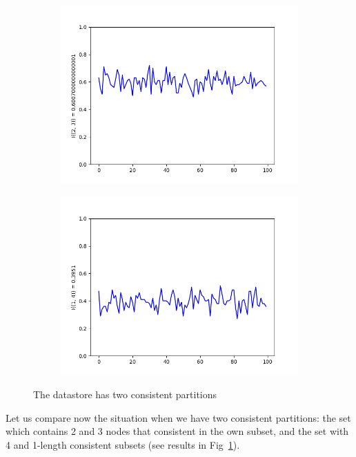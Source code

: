 \documentclass{llncs}
\begin{document}
\begin{figure}
\begin{subfigure}{0.5\linewidth}
\centering\includegraphics[scale=0.4]{images/2-3-consistent-partitions-probability.png}\hfill
\end{subfigure}
\begin{subfigure}{0.5\linewidth}
\centering\includegraphics[scale=0.4]{images/1-4-consistent-partitions-probability.png}
\end{subfigure}
\caption{The datastore has two consistent partitions}\label{pic:two_parts}
\end{figure}
Let us compare now the situation when we have two consistent partitions: the set which contains 2 and 3 nodes that consistent in the own subset, and the set with 4 and 1-length consistent subsets (see results in Fig~\ref{pic:two_parts}).
\end{document}
